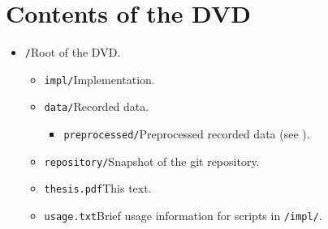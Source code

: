 \chapter{Contents of the DVD}

\begin{itemize}[label={},leftmargin=0pt]
    \item \verb=/=\dotfill{}Root of the DVD.
    \begin{itemize}[label={},leftmargin=1.5em]
        \item \verb=impl/=\dotfill{}Implementation.
        \item \verb=data/=\dotfill{}Recorded data.
        \begin{itemize}[label={},leftmargin=1.5em]
            \item \verb=preprocessed/=\dotfill{}Preprocessed recorded data (see ).
        \end{itemize}
        \item \verb=repository/=\dotfill{}Snapshot of the git repository.
        \item \verb=thesis.pdf=\dotfill{}This text.
        \item \verb=usage.txt=\dotfill{}Brief usage information for scripts in \verb=/impl/=.
    \end{itemize}
\end{itemize}

